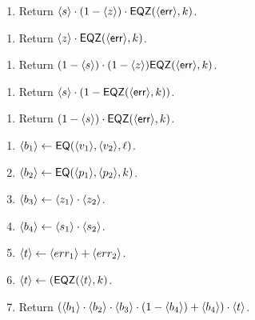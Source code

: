 \begin{enumerate}
\item Return $\langle s \rangle \cdot (1-\langle z \rangle) \cdot \mathsf{EQZ}(\langle \mathsf{err} \rangle, k)$.
\end{enumerate}

\begin{enumerate}
\item Return $\langle z \rangle \cdot \mathsf{EQZ}(\langle \mathsf{err} \rangle, k)$.
\end{enumerate}

\begin{enumerate}
\item Return $(1-\langle s \rangle) \cdot (1-\langle z \rangle) \mathsf{EQZ}(\langle \mathsf{err} \rangle, k)$.
\end{enumerate}

\begin{enumerate}
\item Return $\langle s \rangle \cdot (1 - \mathsf{EQZ}(\langle \mathsf{err} \rangle, k))$.
\end{enumerate}

\begin{enumerate}
\item Return $(1-\langle s \rangle) \cdot \mathsf{EQZ}(\langle \mathsf{err} \rangle, k)$.
\end{enumerate}

\begin{enumerate}
\item $\langle b_1 \rangle \leftarrow \mathsf{EQ}(\langle v_1 \rangle,\langle v_2 \rangle,\ell)$.
\item $\langle b_2 \rangle \leftarrow \mathsf{EQ}(\langle p_1 \rangle,\langle p_2 \rangle,k)$.
\item $\langle b_3 \rangle \leftarrow \langle z_1 \rangle \cdot \langle z_2 \rangle$.
\item $\langle b_4 \rangle \leftarrow \langle s_1 \rangle \cdot \langle s_2 \rangle$.
\item $\langle t \rangle \leftarrow \langle err_1 \rangle + \langle err_2 \rangle$.
\item $\langle t \rangle \leftarrow (\mathsf{EQZ}(\langle t \rangle, k)$.
\item Return $(\langle b_1 \rangle \cdot \langle b_2 \rangle \cdot \langle b_3 \rangle \cdot (1 - \langle b_4 \rangle) + \langle b_4 \rangle) \cdot \langle t \rangle$.
\end{enumerate}

